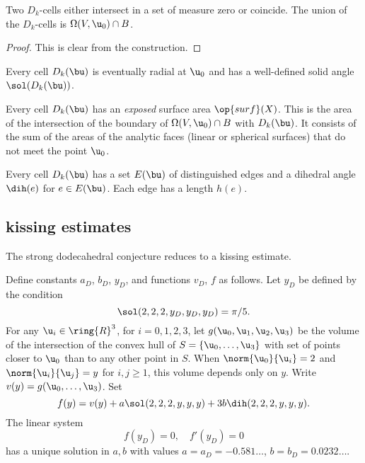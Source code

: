 \begin{lemma}[]
Two $D_k$-cells either intersect in a set of measure
  zero or coincide.  The union of the $D_k$-cells is $\Omega(V,
  \u_0)\cap B$.
\end{lemma}
%

\begin{proof} This is clear from the construction.
\end{proof}

Every cell $D_k(\bu)$ is eventually radial at $ \u_0$ and has
a well-defined solid angle $\sol(D_k(\bu))$.
%

Every cell $D_k(\bu)$ has an {\it exposed} surface area $\op{surf}(X)$.
This is the area of the intersection of the boundary of 
$\Omega(V, \u_0)\cap B$ with $D_k(\bu)$.  It consists of the sum of the
areas of the analytic faces (linear or spherical surfaces) that do not meet the point $ \u_0$.
%
%
%

Every cell $D_k(\bu)$ has a set $E(\bu)$ of distinguished edges and a
dihedral angle $\dih(e)$ for $e\in E(\bu)$.  Each edge has a length
$h(e)$.  %
%
%
%

\subsection{kissing estimates}

The strong dodecahedral conjecture reduces to a kissing estimate.
%


\begin{definition}[$a_D$,~$b_D$,~$y_D$,~$v_D$,~$f$]
Define constants $a_D$, $b_D$, $y_D$, and functions $v_D$, $f$ as follows.  Let $y_D$ be defined
by the condition
\begin{displaymath}
\sol(2,2,2,y_D,y_D,y_D) = \pi/5.
\end{displaymath}
For any $\u_i\in\ring{R}^3$, for $i=0,1,2,3$,  let $g(\u_0,\u_1,\u_2,\u_3)$ be
the volume of the intersection of the convex hull of $S=\{\u_0,\ldots,\u_3\}$ with set of
points closer to $ \u_0$ than to any other point in $S$.  
When $\norm{\u_0}{\u_i}=2$ and $\norm{ \u_i}{ \u_j} = y$ for $i,j\ge 1$, this
volume depends only on $y$. Write $v(y) = g(\u_0,\ldots,\u_3)$.  Set
\begin{displaymath}
f(y) = v(y) + a \sol(2,2,2,y,y,y) + 3 b \dih(2,2,2,y,y,y).
\end{displaymath}
The linear system
\begin{displaymath}
f(y_D) = 0,\quad f'(y_D) = 0
\end{displaymath}
has a unique solution in $a,b$ with values $a=a_D=-0.581\ldots$,
$b=b_D=0.0232\ldots$.
\end{definition}
%
%
%
%
%
%


